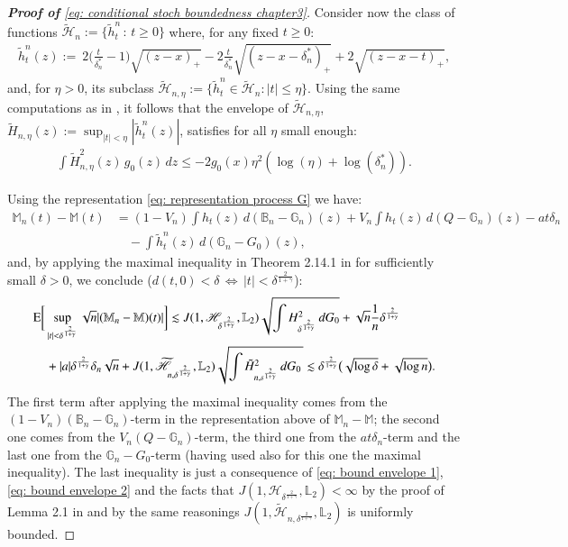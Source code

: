 \begin{proof}[\hypertarget{proof of stoch boundedness}{\textbf{Proof of}} \eqref{eq: conditional stoch boundedness chapter3}]
		Consider now the class of functions $\widetilde{\mathscr{H}}_n := \{ \tilde{h}^n_t \, : \, t \geq 0 \}$ where, for any fixed $t \geq 0$:
		\begin{align*}
		\tilde{h}^n_t (z) := \:  2 \bigg(\frac{t}{\delta^*_n} -1\bigg) \sqrt{(z-x)_{+}} -2\frac{t}{\delta^*_n} \sqrt{(z-x-\delta^*_n)_{+}}   +2 \sqrt{(z-x-t)_{+}} ,
		\end{align*}
		and, for $\eta>0$, its subclass $ \widetilde{\mathscr{H}}_{n,\eta}:=\big\{\tilde{h}^n_t \in \widetilde{\mathscr{H}}_n:|t| \leq \eta\big\}$. Using the same computations as in \cite{1}, it follows that the envelope of $\widetilde{\mathscr{H}}_{n,\eta}$, $\tilde{H}_{n,\eta} (z) := \sup_{|t|< \eta }|\tilde{h}^n_t(z)|$, satisfies for all $\eta$ small enough:
		\begin{align}\label{eq: bound envelope 2}
			\int \tilde{H}^2_{n,\eta} (z) \, g_0(z) \, dz \leq -2g_0(x) \eta^2 (\log{(\eta)} + \log{(\delta^*_n)}).
		\end{align}

		Using the representation \eqref{eq: representation process G} we have:
		\begin{align*}
			\mathbb{M}_n(t) - \mathbb{M}(t) &=  (1-V_n) \int h_t(z) \, d (\mathbb{B}_n - \mathbb{G}_n)(z)   + V_n \int h_t(z) \, d (Q- \mathbb{G}_n)(z) - at \delta_n \\
			& \quad -  \int \tilde{h}^n_t(z) \, d (\mathbb{G}_n-G_0)(z), 
		\end{align*}
		and, by applying the maximal inequality in Theorem 2.14.1 in \cite{5} for sufficiently small $\delta >0$,  we conclude ($d(t,0)< \delta \, \iff \, |t|< \delta^{\frac{2}{1+\gamma}}$):
		\begin{align*}
			&\mathrm{E} \bigg[ \sup_{|t|< \delta^{\frac{2}{1+\gamma}}} \sqrt{n} |(\mathbb{M}_n - \mathbb{M})(t)| \bigg] \lesssim J(1, \mathscr{H}_{\delta^{\frac{2}{1+\gamma}}}, \mathbb{L}_2) \sqrt{\int H^2_{\delta^{\frac{2}{1+\gamma}}} \, dG_0} + \sqrt{n} \frac{1}{n} \delta^{\frac{2}{1+\gamma}} \\
			&\quad + |a| \delta^{\frac{2}{1+\gamma}} \delta_n \sqrt{n} + J(1, \widetilde{\mathscr{H}}_{n,\delta^{\frac{2}{1+\gamma}}}, \mathbb{L}_2) \sqrt{\int \tilde{H}^2_{n,\scriptscriptstyle{\delta^{\frac{2}{1+\gamma}}}}\, dG_0 \,}  \lesssim  \delta^{\frac{2}{1+\gamma}} \big(\sqrt{\log{\delta}} + \sqrt{\log{n}} \big).
		\end{align*}
		The first term after applying the maximal inequality comes from the $(1-V_n)(\mathbb{B}_n - \mathbb{G}_n)$-term in the representation above of $\mathbb{M}_n - \mathbb{M}$; the second one comes from the $V_n(Q - \mathbb{G}_n)$-term, the third one from the $at \delta_n $-term and the last one from the $\mathbb{G}_n-G_0$-term (having used also for this one the maximal inequality). The last inequality is just a consequence of \eqref{eq: bound envelope 1}, \eqref{eq: bound envelope 2} and the facts that $J(1, \mathscr{H}_{\delta^{\frac{2}{1+\gamma}}}, \mathbb{L}_2) < \infty$ by the proof of Lemma 2.1 in \cite{27} and by the same reasonings $J(1, \widetilde{\mathscr{H}}_{n,\delta^{\frac{2}{1+\gamma}}}, \mathbb{L}_2) $ is uniformly bounded.


\end{proof}
